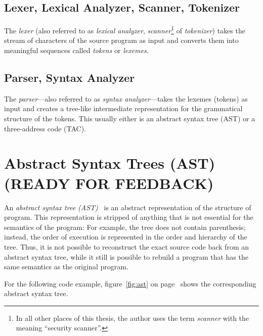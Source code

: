\subsection{Lexer, Lexical Analyzer, Scanner, Tokenizer}

The \emph{lexer} (also referred to as \emph{lexical analyzer}, \emph{scanner}\footnote{In all other places of this thesis, the author uses the term \emph{scanner} with the meaning ``security scanner''.} of \emph{tokenizer}) takes the stream of characters of the source program as input and converts them into meaningful sequences called \emph{tokens} or \emph{lexemes}.~\cite{compilers, compiler-construction}


\subsection{Parser, Syntax Analyzer}

The \emph{parser}---also referred to as \emph{syntax analyzer}---takes the lexemes (tokens) as input and creates a tree-like intermediate representation for the grammatical structure of the to\-kens. This usually either is an abstract syntax tree (AST) or a three-address code (TAC).~\cite{compilers, compiler-construction}


\section{Abstract Syntax Trees (AST) (READY FOR FEEDBACK)}
\label{ast}

An \emph{abstract syntax tree (AST)}~\cite{compiler-construction} is an abstract representation of the structure of program. This representation is stripped of anything that is not essential for the semantics of the program: For example, the tree does not contain parenthesis; instead, the order of execution is represented in the order and hierarchy of the tree. Thus, it is not possible to reconstruct the exact source code back from an abstract syntax tree, while it still is possible to rebuild a program that has the same semantics as the original program.

For the following code example, figure~\ref{fig:ast} on page~\pageref{fig:ast} shows the corresponding abstract syntax tree.

